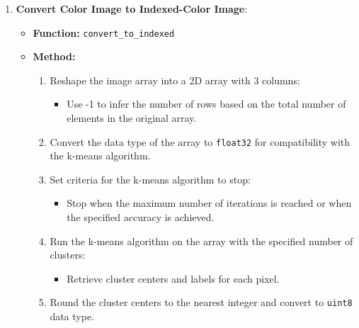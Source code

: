 \documentclass{article}
\begin{document}
\begin{enumerate}
    \item \textbf{Convert Color Image to Indexed-Color Image}:
    \begin{itemize}
        \item \textbf{Function:} \texttt{convert\_to\_indexed}
        \item \textbf{Method:}
        \begin{enumerate}
            \item Reshape the image array into a 2D array with 3 columns:
            \begin{itemize}
                \item Use -1 to infer the number of rows based on the total number of elements in the original array.
            \end{itemize}
            \item Convert the data type of the array to \texttt{float32} for compatibility with the k-means algorithm.
            \item Set criteria for the k-means algorithm to stop:
            \begin{itemize}
                \item Stop when the maximum number of iterations is reached or when the specified accuracy is achieved.
            \end{itemize}
            \item Run the k-means algorithm on the array with the specified number of clusters:
            \begin{itemize}
                \item Retrieve cluster centers and labels for each pixel.
            \end{itemize}
            \item Round the cluster centers to the nearest integer and convert to \texttt{uint8} data type.
        \end{enumerate}
    \end{itemize}
\end{enumerate}
\end{document}
